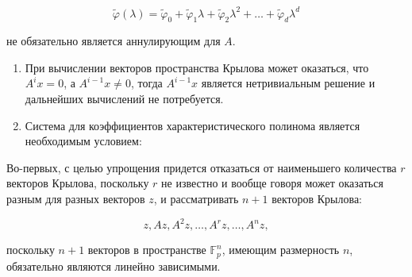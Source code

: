 \documentclass[a4paper,12pt]{book}
\newcommand{\gfpvector}[1]{\mathbb{F}^{#1}_p}
\newcommand{\polynomial}[1]{ #1 (\lambda)}
\begin{document}
$$ \polynomial{\tilde \varphi} = \tilde \varphi_0 + \tilde \varphi_1\lambda + \tilde \varphi_2\lambda^2 + \ldots + \tilde \varphi_d\lambda^d $$

не обязательно является аннулирующим для $A$.

\begin{enumerate}
	\item При вычислении векторов пространства Крылова может оказаться, что $A^ix = 0$, а $A^{i-1}x \neq 0$, тогда $A^{i-1}x$ является
		нетривиальным решение и дальнейших вычислений не потребуется.
	\item Система для коэффициентов характеристического полинома является необходимым условием: 
\end{enumerate}

Во-первых, с целью упрощения придется отказаться от наименьшего количества $r$ векторов Крылова, поскольку $r$ не известно и вообще говоря
может оказаться разным для разных векторов $z$, и рассматривать $n+1$ векторов Крылова:

	$$ z, Az, A^2z, \dots, A^rz, \dots, A^nz, $$

поскольку $n+1$ векторов в пространстве $\gfpvector{n}$, имеющим размерность $n$, обязательно являются линейно зависимыми.


\end{document}
